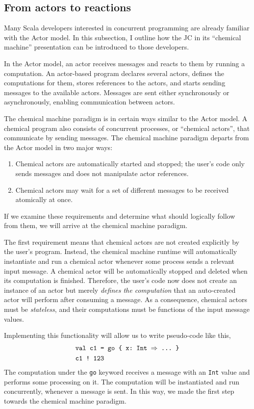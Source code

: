 \documentclass[sigplan,10pt]{acmart}\settopmatter{}
\begin{document}
\subsection{From actors to reactions}

Many Scala developers interested in concurrent programming are already
familiar with the Actor model. In this subsection, I outline how the
JC in its ``chemical machine'' presentation can be introduced
to those developers.

In the Actor model, an actor receives messages and reacts to them
by running a computation. An actor-based program declares several
actors, defines the computations for them, stores references to the
actors, and starts sending messages to the available actors. Messages
are sent either synchronously or asynchronously, enabling communication
between actors.

The chemical machine paradigm is in certain ways similar to the Actor
model. A chemical program also consists of concurrent processes, or
``chemical actors'', that communicate by sending messages. The chemical
machine paradigm departs from the Actor model in two major ways: 
\begin{enumerate}
\item Chemical actors are automatically started and stopped; the user's
code only sends messages and does not manipulate actor references.
\item Chemical actors may wait for a set of different messages to be received
atomically at once.
\end{enumerate}
If we examine these requirements and determine what should logically
follow from them, we will arrive at the chemical machine paradigm.

The first requirement means that chemical actors are not created explicitly
by the user's program. Instead, the chemical machine runtime will
automatically instantiate and run a chemical actor whenever some process
sends a relevant input message. A chemical actor will be automatically
stopped and deleted when its computation is finished. Therefore, the
user's code now does not create an instance of an actor but merely
\emph{defines the computation} that an auto-created actor will perform
after consuming a message. As a consequence, chemical actors must
be \emph{stateless}, and their computations must be functions of the
input message values.

Implementing this functionality will allow us to write pseudo-code
like this,
\begin{align*}
\text{} & \texttt{val c1 }\text{\texttt{= go \{ x:~Int \ensuremath{\Rightarrow} ...~\}}}\\
 & \text{\texttt{c1 !~123 }}
\end{align*}
The computation under the \texttt{go} keyword receives a message with
an \texttt{Int} value and performs some processing on it. The computation
will be instantiated and run concurrently, whenever a message is sent.
In this way, we made the first step towards the chemical machine paradigm. 
\end{document}
